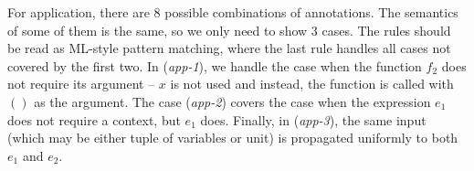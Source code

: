 For application, there are 8 possible combinations of annotations. The semantics of some of them
is the same, so we only need to show 3 cases. The rules should be read as ML-style pattern matching,
where the last rule handles all cases not covered by the first two. In (\emph{app-1}), we handle the
case when the function $f_2$ does not require its argument -- $x$ is not used and instead, the function
is called with $()$ as the argument. The case (\emph{app-2}) covers the case when the expression
$e_1$ does not require a context, but $e_1$ does. Finally, in (\emph{app-3}), the same input
(which may be either tuple of variables or unit) is propagated uniformly to both $e_1$ and $e_2$.


